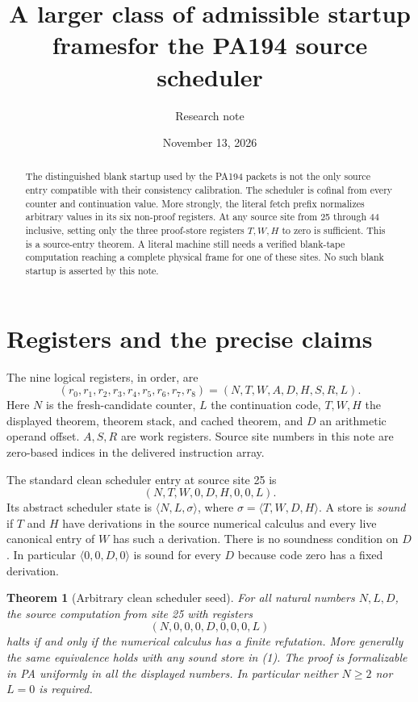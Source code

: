 \documentclass[11pt]{article}
\title{A larger class of admissible startup frames\newline for the PA194 source scheduler}
\author{Research note}
\date{November 13, 2026}
\newtheorem{theorem}{Theorem}
\begin{document}
\maketitle

\begin{abstract}
The distinguished blank startup used by the PA194 packets is not the only
source entry compatible with their consistency calibration. The scheduler
is cofinal from every counter and continuation value. More strongly, the
literal fetch prefix normalizes arbitrary values in its six non-proof
registers. At any source site from 25 through 44 inclusive, setting only
the three proof-store registers $T,W,H$ to zero is sufficient. This is a
source-entry theorem. A literal machine still needs a verified blank-tape
computation reaching a complete physical frame for one of these sites.
No such blank startup is asserted by this note.
\end{abstract}

\section{Registers and the precise claims}

The nine logical registers, in order, are
\[
 (r_0,r_1,r_2,r_3,r_4,r_5,r_6,r_7,r_8)
       =(N,T,W,A,D,H,S,R,L).
\]
Here $N$ is the fresh-candidate counter, $L$ the continuation code,
$T,W,H$ the displayed theorem, theorem stack, and cached theorem, and $D$
an arithmetic operand offset. $A,S,R$ are work registers. Source site
numbers in this note are zero-based indices in the delivered instruction
array.

The standard clean scheduler entry at source site 25 is
\[
 (N,T,W,0,D,H,0,0,L).
\tag{1}
\]
Its abstract scheduler state is $\langle N,L,\sigma\rangle$, where
$\sigma=\langle T,W,D,H\rangle$. A store is \emph{sound} if $T$ and $H$
have derivations in the source numerical calculus and every live canonical
entry of $W$ has such a derivation. There is no soundness condition on
$D$. In particular $\langle0,0,D,0\rangle$ is sound for every $D$ because
code zero has a fixed derivation.

\begin{theorem}[Arbitrary clean scheduler seed]\label{thm:clean}
For all natural numbers $N,L,D$, the source computation from site 25 with
registers
\[
                (N,0,0,0,D,0,0,0,L)
\tag{2}
\]
halts if and only if the numerical calculus has a finite refutation.
More generally the same equivalence holds with any sound store in (1).
The proof is formalizable in PA uniformly in all the displayed numbers.
In particular neither $N\ge2$ nor $L=0$ is required.
\end{theorem}
\end{document}
